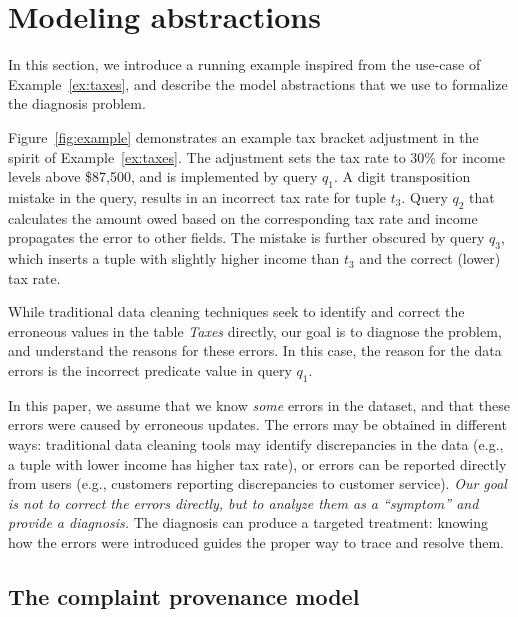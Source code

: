 
\section{Modeling abstractions}
\label{sec:abstractions}

In this section, we introduce a running example inspired from the use-case of
Example~\ref{ex:taxes}, and describe the model abstractions that we use to
formalize the diagnosis problem.





\begin{example}\label{ex:taxes2}
    
Figure~\ref{fig:example} demonstrates an example tax bracket adjustment in the
spirit of Example~\ref{ex:taxes}. The adjustment sets the tax rate to 30\% for
income levels above \$87,500, and is implemented by query $q_1$. A digit
transposition mistake in the query, results in an incorrect tax rate for tuple
$t_3$. Query $q_2$ that calculates the amount owed based on the corresponding
tax rate and income propagates the error to other fields. The mistake is
further obscured by query $q_3$, which inserts a tuple with slightly higher
income than $t_3$ and the correct (lower) tax rate.

\end{example}
% 
While traditional data cleaning techniques seek to identify and correct the
erroneous values in the table \emph{Taxes} directly, our goal is to diagnose
the problem, and understand the reasons for these errors. In this case, the
reason for the data errors is the incorrect predicate value in query $q_1$.

In this paper, we assume that we know \emph{some} errors in the dataset, and
that these errors were caused by erroneous updates. The errors may be
obtained in different ways: traditional data cleaning tools may identify
discrepancies in the data (e.g., a tuple with lower income has higher tax
rate), or errors can be reported directly from users (e.g., customers
reporting discrepancies to customer service). \emph{Our goal is not to correct
the errors directly, but to analyze them as a ``symptom'' and provide a
diagnosis.} The diagnosis can produce a targeted treatment: knowing how the
errors were introduced guides the proper way to trace and resolve them.




\subsection{The complaint provenance model}
\label{sec:model}

